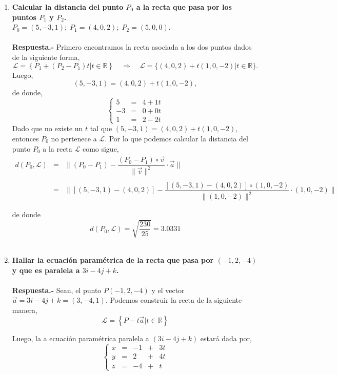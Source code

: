 \begin{enumerate}
    \item \textbf{\boldmath Calcular la distancia del punto $P_0$ a la recta que pasa por los puntos $P_1$ y $P_2$.\\ $P_0 = (5,-3,1); \; P_1=(4,0,2);\; P_2=(5,0,0)$.\\\\
	Respuesta.-}\; Primero encontramos la recta asociada a los dos puntos dados de la siguiente forma, $$\mathscr{L} = \left\{P_1 +(P_2-P_1)t | t \in \mathbb{R}\right\} \quad \Rightarrow \quad \mathscr{L} = \lbrace (4,0,2) + t(1,0,-2) | t \in \mathbb{R} \rbrace.$$
    Luego,
    $$(5,-3,1)=(4,0,2)+t(1,0,-2),$$
    de donde,
    $$\left\{\begin{array}{rcl}
	5&=&4+1t\\
	-3&=&0+0t\\
	1&=&2-2t
    \end{array}\right.$$
    Dado que no existe un $t$ tal que $(5,-3,1)=(4,0,2)+t(1,0,-2)$, entonces $P_0$ no pertenece a $\mathscr{L}$. Por lo que podemos calcular la distancia del punto $P_0$ a la recta $\mathscr{L}$ como sigue, 
    $$\begin{array}{rcl}
	d(P_0,\mathscr{L}) &=& \bigg\| (P_0 - P_1) - \dfrac{(P_0-P_1)\circ \vec{v}}{\|\vec{v}\|^2}\cdot \vec{a}\bigg\| \\\\
			   &=& \bigg\| [(5,-3,1)-(4,0,2)] - \dfrac{\left[(5,-3,1)-(4,0,2)\right]\circ (1,0,-2)}{\|(1,0,-2)\|^2} \cdot (1,0,-2)\bigg\|
    \end{array}$$

	    de donde $$d(P_0,\mathcal{L}) = \sqrt{\dfrac{230}{25}} = 3.0331$$\\

    \item \textbf{\boldmath Hallar la ecuación paramétrica de la recta que pasa por $(-1,2,-4)$ y que es paralela a $3i-4j+k$.\\\\
	Respuesta.-}\; Sean, el punto $P(-1,2,-4)$ y el vector $\vec{a}=3i-4j+k=(3,-4,1)$. Podemos construir la recta de la siguiente manera,
	$$\mathscr{L}=\left\{P-t\vec{a} | t\in \mathbb{R}\right\}$$

	Luego, la a ecuación paramétrica paralela a $(3i-4j+k)$ estará dada por,
	$$\left\{\begin{array}{rcrcr}
		x &=& -1 &+& 3t\\
		y &=& 2 &+& 4t\\
		z &=& -4 &+& t
	\end{array}\right.$$
	\vspace{0.5cm}


\end{enumerate}

